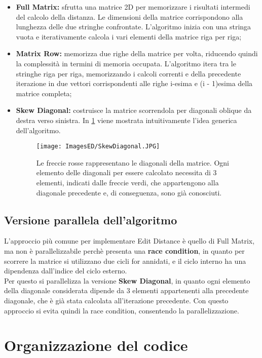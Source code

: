 \documentclass[10pt,twocolumn,letterpaper]{article}
\newcommand{\bit} {\begin{itemize} }
\newcommand{\eit} {\end{itemize} }
\begin{document}
\bit
    \item{\textbf{Full Matrix:} sfrutta una matrice 2D per memorizzare i risultati intermedi del calcolo della distanza. Le dimensioni della matrice corrispondono alla lunghezza delle due stringhe confrontate. L'algoritmo inizia con una stringa vuota e iterativamente calcola i vari elementi della matrice riga per riga;}
    \item{\textbf{Matrix Row:} memorizza due righe della matrice per volta, riducendo quindi la complessità in termini di memoria occupata. L'algoritmo itera tra le stringhe riga per riga, memorizzando i calcoli correnti e della precedente iterazione in due vettori corrispondenti alle righe i-esima e (i - 1)esima della matrice completa;}
    \item{\textbf{Skew Diagonal:} costruisce la matrice scorrendola per diagonali oblique da destra verso sinistra. In \cref{fig:sd} viene mostrata intuitivamente l'idea generica dell'algoritmo.}
    
    \begin{figure}[h]
        \centering
        \texttt{[image: ImagesED/SkewDiagonal.JPG]}
        \caption{Le freccie rosse rappresentano le diagonali della matrice. Ogni elemento delle diagonali per essere calcolato necessita di 3 elementi, indicati dalle freccie verdi, che appartengono alla diagonale precedente e, di conseguenza, sono già conosciuti.}
        \label{fig:sd}
    \end{figure}
    
\eit

\subsection{Versione parallela dell'algoritmo}

L'approccio più comune per implementare Edit Distance è quello di Full Matrix, ma non è parallelizzabile perchè presenta una \textbf{race condition}, in quanto per scorrere la matrice si utilizzano due cicli for annidati, e il ciclo interno ha una dipendenza dall'indice del ciclo esterno.\\
Per questo si parallelizza la versione \textbf{Skew Diagonal}, in quanto ogni elemento della diagonale considerata dipende da 3 elementi appartenenti alla precedente diagonale, che è già stata calcolata all'iterazione precedente. Con questo approccio si evita quindi la race condition, consentendo la parallelizzazione.


\section{Organizzazione del codice}
\end{document}
